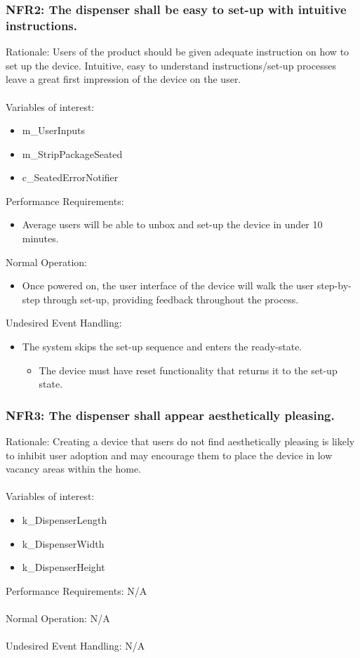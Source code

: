 \documentclass[12pt]{article}
\begin{document}
\subsubsection*{NFR2: The dispenser shall be easy to set-up with intuitive instructions.}
Rationale: Users of the product should be given adequate instruction on how to set up the device. Intuitive, easy to understand instructions/set-up processes leave a great first impression of the device on the user.
\\\\
Variables of interest:
\begin{itemize}[noitemsep,topsep=0pt]
    \item m\_UserInputs
    \item m\_StripPackageSeated
    \item c\_SeatedErrorNotifier
\end{itemize} 
\bigskip
Performance Requirements:
\begin{itemize}[noitemsep,topsep=0pt]
    \item Average users will be able to unbox and set-up the device in under 10 minutes.
\end{itemize}
\bigskip
Normal Operation:
\begin{itemize}[noitemsep,topsep=0pt]
    \item Once powered on, the user interface of the device will walk the user step-by-step through set-up, providing feedback throughout the process.
\end{itemize}
\bigskip
Undesired Event Handling:
\begin{itemize}[noitemsep,topsep=0pt]
    \item The system skips the set-up sequence and enters the ready-state.
    \begin{itemize}
        \item The device must have reset functionality that returns it to the set-up state.
    \end{itemize}
\end{itemize}
\bigskip

\subsubsection*{NFR3: The dispenser shall appear aesthetically pleasing.}
Rationale: Creating a device that users do not find aesthetically pleasing is likely to inhibit user adoption and may encourage them to place the device in low vacancy areas within the home.
\\\\
Variables of interest:
\begin{itemize}[noitemsep,topsep=0pt]
    \item k\_DispenserLength
    \item k\_DispenserWidth
    \item k\_DispenserHeight
\end{itemize} 
\bigskip
Performance Requirements: N/A
\\ \\
Normal Operation: N/A
\\ \\
Undesired Event Handling: N/A
\\
\end{document}
